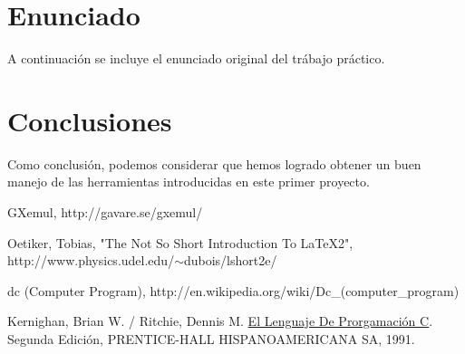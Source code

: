 \documentclass[a4paper,10pt]{article}
\begin{document}
\pagebreak

\section{Enunciado} 

A continuaci\'on se incluye el enunciado original del tr\'abajo pr\'actico.
\pagebreak

\section{Conclusiones}
Como conclusi\'on, podemos considerar que hemos logrado obtener un buen manejo de las herramientas introducidas en este primer proyecto.

\pagebreak

\begin{thebibliography}{99}

 GXemul, http://gavare.se/gxemul/

 Oetiker, Tobias, "The Not So Short Introduction To LaTeX2", http://www.physics.udel.edu/$\sim$dubois/lshort2e/

 dc (Computer Program), http://en.wikipedia.org/wiki/Dc\_(computer\_program)

 Kernighan, Brian W. / Ritchie, Dennis M. \underline{El Lenguaje De Prorgamaci\'on C}. Segunda Edici\'on, PRENTICE-HALL HISPANOAMERICANA SA, 1991.

\end{thebibliography}
\end{document}
